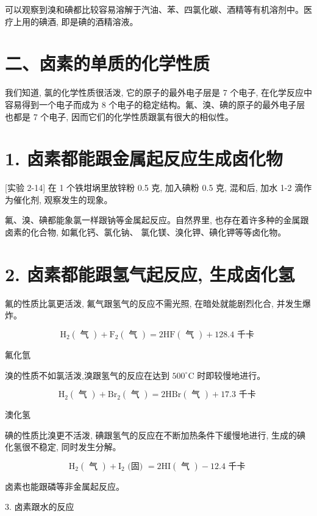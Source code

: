 \documentclass[10pt]{article}
\begin{document}
可以观察到溴和碘都比较容易溶解于汽油、苯、四氯化碳、酒精等有机溶剂中。医疗上用的碘酒, 即是碘的酒精溶液。

\section*{二、卤素的单质的化学性质}

我们知道, 氯的化学性质很活泼, 它的原子的最外电子层是 7 个电子, 在化学反应中容易得到一个电子而成为 8 个电子的稳定结构。氟、溴、碘的原子的最外电子层也都是 7 个电子, 因而它们的化学性质跟氯有很大的相似性。

\section*{1. 卤素都能跟金属起反应生成卤化物}

[实验 2-14] 在 1 个铁坩埚里放锌粉 0.5 克, 加入碘粉 0.5 克, 混和后, 加水 1-2 滴作为催化剂, 观察发生的现象。

氟、溴、碘都能象氯一样跟钠等金属起反应。自然界里, 也存在着许多种的金属跟卤素的化合物, 如氟化钙、氯化钠、 氯化镁、溴化钾、碘化钾等等卤化物。

\section*{2. 卤素都能跟氢气起反应, 生成卤化氢}

氟的性质比氯更活泼, 氟气跟氢气的反应不需光照, 在暗处就能剧烈化合, 并发生爆炸。

\[
{\mathrm{H}}_{2}\left( \text{ 气 }\right) + {\mathrm{F}}_{2}\left( \text{ 气 }\right) = 2\mathrm{{HF}}\left( \text{ 气 }\right) + {128.4}\text{ 千卡 }
\]

氟化氫

溴的性质不如氯活泼,溴跟氢气的反应在达到 \({500}^{ \circ }\mathrm{C}\) 时即较慢地进行。

\[
{\mathrm{H}}_{2}\left( \text{ 气 }\right) + {\mathrm{{Br}}}_{2}\left( \text{ 气 }\right) = 2\mathrm{{HBr}}\left( \text{ 气 }\right) + {17.3}\text{ 千卡 }
\]

澳化氢

碘的性质比溴更不活泼, 碘跟氢气的反应在不断加热条件下缓慢地进行, 生成的碘化氢很不稳定, 同时发生分解。

\[
{\mathrm{H}}_{2}\left( \text{ 气 }\right) + {\mathrm{I}}_{2}\text{ (固) } = 2\mathrm{{HI}}\left( \text{ 气 }\right) - {12.4}\text{ 千卡 }
\]

卤素也能跟磷等非金属起反应。

3. 卤素跟水的反应
\end{document}
